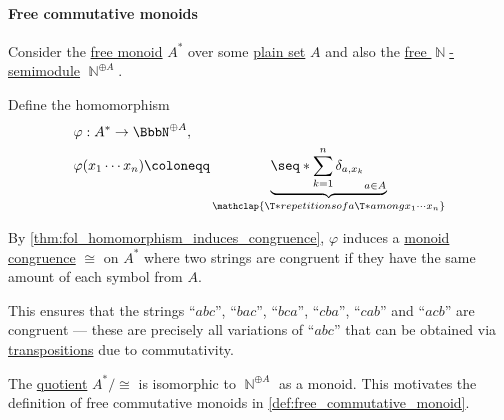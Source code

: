 \paragraph{Free commutative monoids}

\begin{remark}\label{rem:free_commutative_monoid_as_quotient}
  Consider the \hyperref[def:free_monoid]{free monoid} \( A^* \) over some \hyperref[def:set]{plain set} \( A \) and also the \hyperref[def:free_semimodule]{free \( \BbbN \)-semimodule} \( \BbbN^{\oplus A} \).

  Define the homomorphism
  \begin{equation*}
    \begin{aligned}
      &\varphi: A^* \to \BbbN^{\oplus A}, \\
      &\varphi(x_1 \cdots x_n) \coloneqq \underbrace{\seq*{ \sum_{k=1}^n \delta_{a,x_k}}_{a \in A}}_{\mathclap{\T*{repetitions of} a \T*{among} x_1 \cdots x_n} }
    \end{aligned}
  \end{equation*}

  By \cref{thm:fol_homomorphism_induces_congruence}, \( \varphi \) induces a \hyperref[def:fol_congruence]{monoid congruence} \( \cong \) on \( A^* \) where two strings are congruent if they have the same amount of each symbol from \( A \).

  This ensures that the strings \enquote{\( abc \)}, \enquote{\( bac \)}, \enquote{\( bca \)}, \enquote{\( cba \)}, \enquote{\( cab \)} and \enquote{\( acb \)} are congruent --- these are precisely all variations of \enquote{\( abc \)} that can be obtained via \hyperref[def:transposition]{transpositions} due to commutativity.

  The \hyperref[def:fol_quotient_structure]{quotient} \( A^* / \cong \) is isomorphic to \( \BbbN^{\oplus A} \) as a monoid. This motivates the definition of free commutative monoids in \cref{def:free_commutative_monoid}.
\end{remark}

